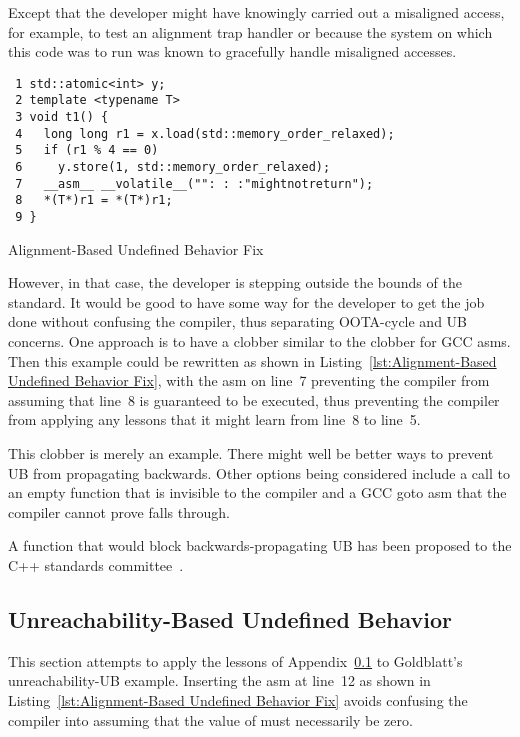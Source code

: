 \documentclass[10]{article}
\begin{document}
Except that the developer might have knowingly carried out a misaligned
access, for example, to test an alignment trap handler or because the
system on which this code was to run was known to gracefully handle
misaligned accesses.

\begin{listing}[tbp]
\begin{verbatim}
 1 std::atomic<int> y;
 2 template <typename T>
 3 void t1() {
 4   long long r1 = x.load(std::memory_order_relaxed);
 5   if (r1 % 4 == 0)
 6     y.store(1, std::memory_order_relaxed);
 7   __asm__ __volatile__("": : :"mightnotreturn");
 8   *(T*)r1 = *(T*)r1;
 9 }
\end{verbatim}
\caption{Alignment-Based Undefined Behavior Fix}
\label{lst:Alignment-Based Undefined Behavior Fix}
\end{listing}

However, in that case, the developer is stepping outside the bounds
of the standard.
It would be good to have some way for the developer to get the job
done without confusing the compiler, thus separating OOTA-cycle and
UB concerns.
One approach is to have a  clobber similar to the
 clobber for GCC asms.
Then this example could be rewritten as shown in
Listing~\ref{lst:Alignment-Based Undefined Behavior Fix},
with the asm on line~7 preventing the compiler from assuming that line~8
is guaranteed to be executed, thus preventing the compiler from
applying any lessons that it might learn from line~8 to line~5.


This  clobber is merely an example.
There might well be better ways to prevent UB from propagating backwards.
Other options being considered include a call to an empty function that
is invisible to the compiler and a GCC goto asm that the compiler cannot
prove falls through.

A  function that would block backwards-propagating
UB has been proposed to the C++ standards
committee~\cite{DavisHerring2021P1494R2}.

\subsection{Unreachability-Based Undefined Behavior}
\label{sec:Unreachability-Based Undefined Behavior}

This section attempts to apply the lessons
of Appendix~\ref{sec:Unreachability-Based Undefined Behavior} to
Goldblatt's unreachability-UB example.  Inserting the asm at line~12
as shown in Listing~\ref{lst:Alignment-Based Undefined Behavior Fix}
avoids confusing the compiler into assuming that the value of 
must necessarily be zero.
\end{document}
